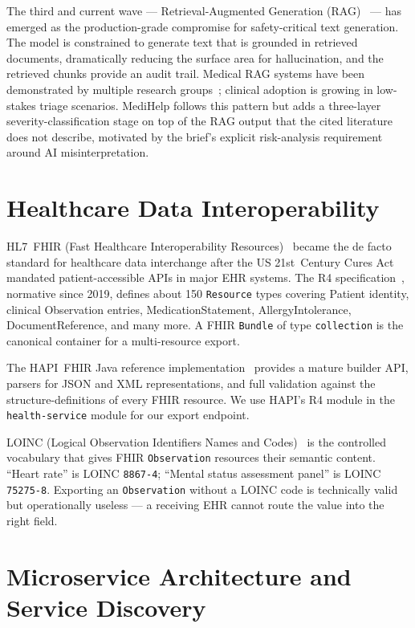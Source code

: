 \documentclass[12pt]{caltech_thesis}
\begin{document}
The third and current wave --- Retrieval-Augmented Generation
(RAG)~\citep{lewis2020retrieval} --- has emerged as the production-grade
compromise for safety-critical text generation. The model is constrained to
generate text that is grounded in retrieved documents, dramatically
reducing the surface area for hallucination, and the retrieved chunks
provide an audit trail. Medical RAG systems have been demonstrated by
multiple research groups~\citep{xiong2024benchmarkingretrieval}; clinical
adoption is growing in low-stakes triage scenarios. MediHelp follows this
pattern but adds a three-layer severity-classification stage on top of the
RAG output that the cited literature does not describe, motivated by the
brief's explicit risk-analysis requirement around AI misinterpretation.

\section{Healthcare Data Interoperability}

HL7~FHIR (Fast Healthcare Interoperability Resources)~\citep{hl7fhir}
became the de facto standard for healthcare data interchange after the US
21st~Century Cures Act mandated patient-accessible APIs in major EHR
systems. The R4 specification~\citep{hl7fhirR4}, normative since 2019,
defines about 150 \texttt{Resource} types covering Patient identity,
clinical Observation entries, MedicationStatement, AllergyIntolerance,
DocumentReference, and many more. A FHIR \texttt{Bundle} of type
\texttt{collection} is the canonical container for a multi-resource
export.

The HAPI~FHIR Java reference implementation~\citep{hapifhir} provides a
mature builder API, parsers for JSON and XML representations, and full
validation against the structure-definitions of every FHIR resource. We
use HAPI's R4 module in the \texttt{health-service} module for our export
endpoint.

LOINC (Logical Observation Identifiers Names and Codes)~\citep{mcdonald2003loinc}
is the controlled vocabulary that gives FHIR \texttt{Observation} resources
their semantic content. ``Heart rate'' is LOINC \texttt{8867-4}; ``Mental
status assessment panel'' is LOINC \texttt{75275-8}. Exporting an
\texttt{Observation} without a LOINC code is technically valid but
operationally useless --- a receiving EHR cannot route the value into the
right field.

\section{Microservice Architecture and Service Discovery}
\end{document}
